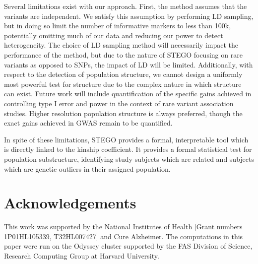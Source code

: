 Several limitations exist with our approach. First, the method assumes
that the variants are independent. We satisfy this assumption by performing
LD sampling, but in doing so limit the number of informative markers
to less than 100k, potentially omitting much of our data and reducing
our power to detect heterogeneity. The choice of LD
sampling method will necessarily impact the performance of the method, but due to the nature of STEGO focusing on rare variants as opposed to SNPs, the impact of LD will be limited.
Additionally, with respect to the detection of population structure,
we cannot design a uniformly most powerful test for structure due
to the complex nature in which structure can exist.  Future work will include quantification of the specific gains achieved in controlling type I error and power in the context of rare variant association studies.  Higher resolution population structure is always preferred, though the exact gains achieved in GWAS remain to be quantified.

In spite of these limitations, STEGO provides a formal, interpretable
tool which is directly linked to the kinship coefficient. It provides
a formal statistical test for population substructure, identifying
study subjects which are related and subjects which are genetic outliers
in their assigned population. 


\section*{Acknowledgements}

This work was supported by the National Institutes of Health [Grant numbers 1P01HL105339, T32HL007427] and Cure Alzheimer. The computations in this paper were run on the Odyssey cluster supported by the FAS Division of Science, Research Computing Group at Harvard University.\vspace*{-12pt}


